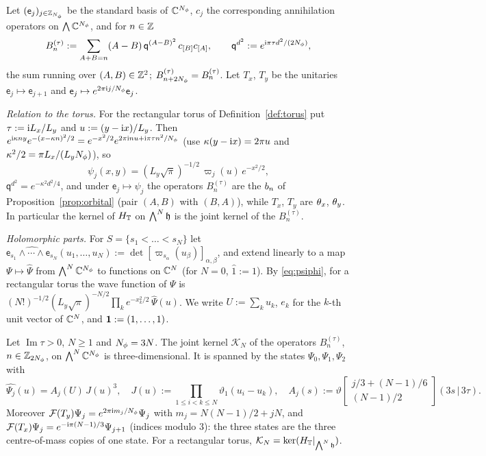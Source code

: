 Let $(\mathsf e_j)_{j\in\mathbb{Z}_{N_{\phi}}}$ be the standard basis of $\mathbb{C}^{N_{\phi}}$, $c_j$ the corresponding annihilation operators on
$\bigwedge\mathbb{C}^{N_{\phi}}$, and for $n\in\mathbb{Z}$
\begin{equation}\label{eq:Bntau}
B_n^{(\tau)}:=\sum_{A+B=n}(A-B)\,\mathsf q^{(A-B)^2}\,c_{[B]}c_{[A]},\qquad \mathsf q^{d^2}:=e^{\mathrm{i}\pi\tau d^2/(2N_{\phi})},
\end{equation}
the sum running over $(A,B)\in\mathbb{Z}^2$; $B^{(\tau)}_{n+2N_{\phi}}=B^{(\tau)}_n$. Let $T_x$, $T_y$ be the unitaries $\mathsf e_j\mapsto\mathsf e_{j+1}$
and $\mathsf e_j\mapsto e^{2\pi\mathrm{i} j/N_{\phi}}\mathsf e_j$.

\emph{Relation to the torus.} For the rectangular torus of Definition~\ref{def:torus} put $\tau:=\mathrm{i} L_x/L_y$ and
$u:=(y-\mathrm{i} x)/L_y$. Then $e^{\mathrm{i}\kappa ny}e^{-(x-\kappa n)^2/2}=e^{-x^2/2}e^{2\pi\mathrm{i} nu+\mathrm{i}\pi\tau n^2/N_{\phi}}$ (use
$\kappa(y-\mathrm{i} x)=2\pi u$ and $\kappa^2/2=\pi L_x/(L_yN_{\phi})$), so
\begin{equation}\label{eq:psiphi}
\psi_j(x,y)=(L_y\sqrt\pi)^{-1/2}\,\varpi_j(u)\,e^{-x^2/2},
\end{equation}
$\mathsf q^{d^2}=e^{-\kappa^2d^2/4}$, and under $\mathsf e_j\mapsto\psi_j$ the operators $B_n^{(\tau)}$ are the $b_{n}$ of
Proposition~\ref{prop:orbital} (pair $(A,B)$ with $(B,A)$), while $T_x$, $T_y$ are $\theta_x$, $\theta_y$. In particular the
kernel of $H_{\mathbb{T}}$ on $\bigwedge^N\mathfrak{h}$ is the joint kernel of the $B_n^{(\tau)}$.

\emph{Holomorphic parts.} For $S=\{s_1<\dots<s_N\}$ let
$\widehat{\mathsf e_{s_1}\wedge\cdots\wedge\mathsf e_{s_N}}(u_1,\dots,u_N):=\det[\varpi_{s_\alpha}(u_\beta)]_{\alpha,\beta}$, and extend linearly to a map
$\Psi\mapsto\widehat\Psi$ from $\bigwedge^N\mathbb{C}^{N_{\phi}}$ to functions on $\mathbb{C}^N$ (for $N=0$, $\widehat{1}:=1$). By
\eqref{eq:psiphi}, for a rectangular torus the wave function of $\Psi$ is
$(N!)^{-1/2}(L_y\sqrt\pi)^{-N/2}\prod_ke^{-x_k^2/2}\,\widehat\Psi(u)$. We write $U:=\sum_ku_k$, $e_k$ for the $k$-th unit vector of
$\mathbb{C}^N$, and $\mathbf{1}:=(1,\dots,1)$.

\begin{theorem}[the kernel at $\Nphi=3N$]\label{thm:kernel}
Let $\operatorname{Im}\tau>0$, $N\ge1$ and $\Nphi=3N$. The joint kernel $\mathcal K_N$ of the operators $B_n^{(\tau)}$,
$n\in\mathbb{Z}_{2N_{\phi}}$, on $\bigwedge^N\mathbb{C}^{N_{\phi}}$ is three-dimensional. It is spanned by the states $\Psi_0,\Psi_1,\Psi_2$ with
\begin{equation}\label{eq:laughlin}
\widehat{\Psi_j}(u)=A_j(U)\,J(u)^3,\quad J(u):=\prod_{1\le i<k\le N}\vartheta_1(u_i-u_k),\quad
A_j(s):=\vartheta\!\begin{bmatrix}j/3+(N-1)/6\\(N-1)/2\end{bmatrix}\!(3s\,|\,3\tau).
\end{equation}
Moreover $\mathcal{F}(T_y)\Psi_j=e^{2\pi\mathrm{i} m_j/N_{\phi}}\Psi_j$ with $m_j=N(N-1)/2+jN$, and
$\mathcal{F}(T_x)\Psi_j=e^{-\mathrm{i}\pi(N-1)/3}\Psi_{j+1}$ (indices modulo $3$): the three states are the three centre-of-mass copies
of one state. For a rectangular torus, $\mathcal K_N=\ker(H_{\mathbb{T}}|_{\bigwedge^N\mathfrak{h}})$.
\end{theorem}

